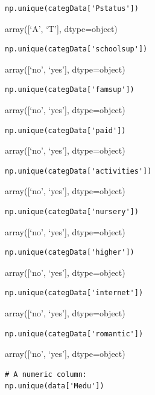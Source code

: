 \documentclass[
]{article}
\begin{document}
\begin{verbatim}
np.unique(categData['Pstatus'])
\end{verbatim}

array({[}`A', `T'{]}, dtype=object)

\begin{verbatim}
np.unique(categData['schoolsup'])
\end{verbatim}

array({[}`no', `yes'{]}, dtype=object)

\begin{verbatim}
np.unique(categData['famsup'])
\end{verbatim}

array({[}`no', `yes'{]}, dtype=object)

\begin{verbatim}
np.unique(categData['paid'])
\end{verbatim}

array({[}`no', `yes'{]}, dtype=object)

\begin{verbatim}
np.unique(categData['activities'])
\end{verbatim}

array({[}`no', `yes'{]}, dtype=object)

\begin{verbatim}
np.unique(categData['nursery'])
\end{verbatim}

array({[}`no', `yes'{]}, dtype=object)

\begin{verbatim}
np.unique(categData['higher'])
\end{verbatim}

array({[}`no', `yes'{]}, dtype=object)

\begin{verbatim}
np.unique(categData['internet'])
\end{verbatim}

array({[}`no', `yes'{]}, dtype=object)

\begin{verbatim}
np.unique(categData['romantic'])
\end{verbatim}

array({[}`no', `yes'{]}, dtype=object)

\begin{verbatim}
# A numeric column:
np.unique(data['Medu'])


\end{verbatim}
\end{document}
